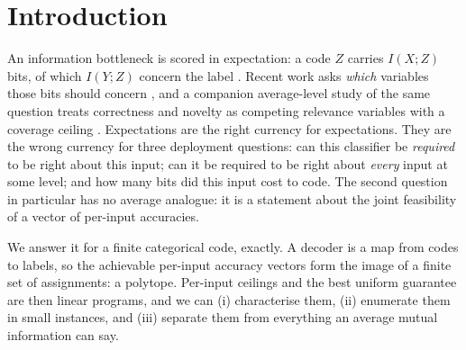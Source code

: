 \documentclass[11pt]{article}
\begin{document}
\section{Introduction}
An information bottleneck is scored in expectation: a code $Z$ carries $I(X;Z)$ bits, of which
$I(Y;Z)$ concern the label \citep{alemi2017vib,tishby1999}. Recent work asks \emph{which}
variables those bits should concern \citep{structured2026,sourcesuff2024,whatsubject2026,scib2026},
and a companion average-level study of the same question treats correctness and novelty as
competing relevance variables with a coverage ceiling \citep{knowing2026}. Expectations are the
right currency for expectations. They are the wrong currency for three deployment questions:
can this classifier be \emph{required} to be right about this input; can it be required to be
right about \emph{every} input at some level; and how many bits did this input cost to code.
The second question in particular has no average analogue: it is a statement about the joint
feasibility of a vector of per-input accuracies.

We answer it for a finite categorical code, exactly. A decoder is a map from codes to labels, so
the achievable per-input accuracy vectors form the image of a finite set of assignments: a
polytope. Per-input ceilings and the best uniform guarantee are then linear programs, and we
can (i) characterise them, (ii) enumerate them in small instances, and (iii) separate them from
everything an average mutual information can say.
\end{document}
